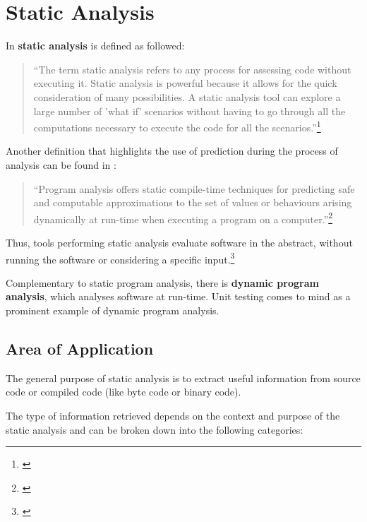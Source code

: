 \chapter{Static Analysis}
\label{chap:StaticAnalysis}

In  \textbf{static analysis} is defined as followed:

\begin{quotation}
``The term static analysis refers to any process for assessing code without
executing it. Static analysis is powerful because it allows for the quick consideration of many possibilities. A static analysis tool can explore a large number of 'what if' scenarios without having to go through all the computations
necessary to execute the code for all the scenarios.''\footnote{\citep[3]{SecureProgramming}}
\end{quotation}

Another definition that highlights the use of prediction during the process of analysis can be found in :

\begin{quotation}
``Program analysis offers static compile-time techniques for predicting safe and computable approximations to the set of values or behaviours arising dynamically at run-time when executing a program on a computer.''\footnote{\citep[1]{ProgramAnalysis}}
\end{quotation}

Thus, tools performing static analysis evaluate software in the abstract, without running the software or considering a specific input.\footnote{\citep[1]{UsingSAToFindBugs}}

Complementary to static program analysis, there is \textbf{dynamic program analysis}, which analyses software at run-time. Unit testing comes to mind as a prominent example of dynamic program analysis.

\newpage
\section{Area of Application}
\label{sec:AreaOfApplication}

The general purpose of static analysis is to extract useful information from source code or compiled code (like byte code or binary code).

The type of information retrieved depends on the context and purpose of the static analysis and can be broken down into the following categories:

